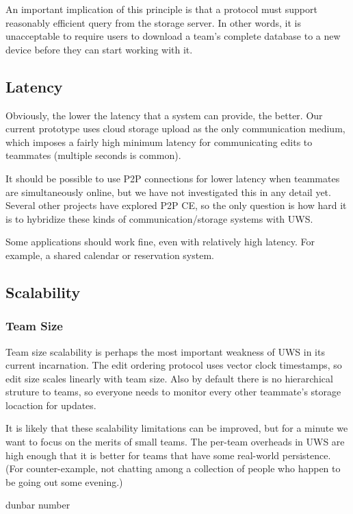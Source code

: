 \documentclass{article}
\begin{document}
An important implication of this principle is that a protocol must support reasonably efficient query from the storage server.
In other words, it is unacceptable to require users to download a team's complete database to a new device before they can start working with it.

\subsection{Latency}

Obviously, the lower the latency that a system can provide, the better.
Our current prototype uses cloud storage upload as the only communication medium, which imposes a fairly high minimum latency for communicating edits to teammates (multiple seconds is common).

It should be possible to use P2P connections for lower latency when teammates are simultaneously online, but we have not investigated this in any detail yet.
Several other projects have explored P2P CE, so the only question is how hard it is to hybridize these kinds of communication/storage systems with UWS.

Some applications should work fine, even with relatively high latency.
For example, a shared calendar or reservation system.

\subsection{Scalability}

\subsubsection{Team Size}

Team size scalability is perhaps the most important weakness of UWS in its current incarnation.
The edit ordering protocol uses vector clock timestamps, so edit size scales linearly with team size.
Also by default there is no hierarchical struture to teams, so everyone needs to monitor every other teammate's storage locaction for updates.

It is likely that these scalability limitations can be improved, but for a minute we want to focus on the merits of small teams.
The per-team overheads in UWS are high enough that it is better for teams that have some real-world persistence.
(For counter-example, not chatting among a collection of people who happen to be going out some evening.)

dunbar number
\end{document}
